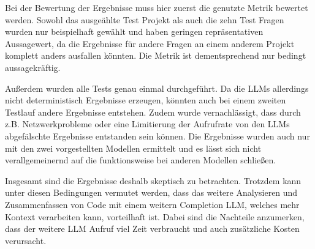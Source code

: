\documentclass[../main.tex]{subfiles}
\begin{document}
Bei der Bewertung der Ergebnisse muss hier zuerst die genutzte Metrik bewertet werden.
Sowohl das ausgeählte Test Projekt als auch die zehn Test Fragen wurden nur beispielhaft gewählt und haben geringen repräsentativen Aussagewert, da die Ergebnisse für andere Fragen an einem anderem Projekt komplett anders ausfallen könnten.
Die Metrik ist dementsprechend nur bedingt aussagekräftig.

Außerdem wurden alle Tests genau einmal durchgeführt. 
Da die \glspl{LLM} allerdings nicht deterministisch Ergebnisse erzeugen, könnten auch bei einem zweiten Testlauf andere Ergebnisse entstehen.
Zudem wurde vernachlässigt, dass durch z.B. Netzwerkprobleme oder eine Limitierung der Aufrufrate von den \glspl{LLM} abgefälschte Ergebnisse entstanden sein können.
Die Ergebnisse wurden auch nur mit den zwei vorgestellten Modellen ermittelt und es lässt sich nicht verallgemeinernd auf die funktionsweise bei anderen Modellen schließen.

Insgesamt sind die Ergebnisse deshalb skeptisch zu betrachten.
Trotzdem kann unter diesen Bedingungen vermutet werden, dass das weitere Analysieren und Zusammenfassen von Code mit einem weitern Completion \gls{LLM}, welches mehr Kontext verarbeiten kann, vorteilhaft ist.
Dabei sind die Nachteile anzumerken, dass der weitere \gls{LLM} Aufruf viel Zeit verbraucht und auch zusätzliche Kosten verursacht. 
\end{document}
